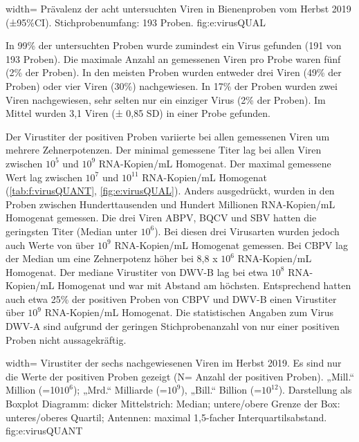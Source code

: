   {width=\textwidth} %
  {Prävalenz der acht untersuchten Viren in Bienenproben vom Herbst 2019 (±95\%CI). Stichprobenumfang: 193 Proben.} %
  {} %
  {fig:e:virusQUAL} %

In 99\% der untersuchten Proben wurde zumindest ein Virus gefunden (191 von 193 Proben). Die maximale Anzahl an gemessenen Viren pro Probe waren fünf (2\% der Proben). In den meisten Proben wurden entweder drei Viren (49\% der Proben) oder vier Viren (30\%) nachgewiesen. In 17\% der Proben wurden zwei Viren nachgewiesen, sehr selten nur ein einziger Virus (2\% der Proben). Im Mittel wurden 3,1 Viren (± 0,85 SD) in einer Probe gefunden.



Der Virustiter der positiven Proben variierte bei allen gemessenen Viren um mehrere Zehnerpotenzen. Der minimal gemessene Titer lag bei allen Viren zwischen $10^5$ und $10^9$ RNA-Kopien/\si{\milli\liter} Homogenat. Der maximal gemessene Wert lag zwischen $10^7$ und $10^{11}$ RNA-Kopien/\si{\milli\liter} Homogenat (\cref{tab:f:virusQUANT}, \cref{fig:e:virusQUAL}). Anders ausgedrückt, wurden in den Proben zwischen Hunderttausenden und Hundert Millionen RNA-Kopien/\si{\milli\liter} Homogenat gemessen. Die drei Viren ABPV, BQCV und SBV hatten die geringsten Titer (Median unter $10^6$). Bei diesen drei Virusarten wurden jedoch auch Werte von über $10^9$ RNA-Kopien/\si{\milli\liter} Homogenat gemessen. Bei CBPV lag der Median um eine Zehnerpotenz höher bei 8,8 x $10^6$ RNA-Kopien/\si{\milli\liter} Homogenat. Der mediane Virustiter von DWV-B lag bei etwa $10^8$ RNA-Kopien/\si{\milli\liter} Homogenat und war mit Abstand am höchsten. Entsprechend hatten auch etwa 25\% der positiven Proben von CBPV und DWV-B einen Virustiter über $10^9$ RNA-Kopien/\si{\milli\liter} Homogenat. Die statistischen Angaben zum Virus DWV-A sind aufgrund der geringen Stichprobenanzahl von nur einer positiven Proben nicht aussagekräftig.


  {width=\textwidth} %
  {Virustiter der sechs nachgewiesenen Viren im Herbst 2019. Es sind nur die Werte der positiven Proben gezeigt (N= Anzahl der positiven Proben). „Mill.“ Million (=10$10^6$); „Mrd.“ Milliarde (=$10^9$), „Bill.“ Billion (=$10^{12}$). Darstellung als Boxplot Diagramm: dicker Mittelstrich: Median; untere/obere Grenze der Box: unteres/oberes Quartil; Antennen: maximal 1,5-facher Interquartilsabstand.} %
  {} %
  {fig:e:virusQUANT} %


